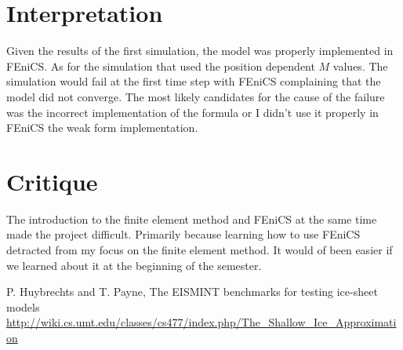 \documentclass{article}%
\begin{document}
    \section{Interpretation}

    Given the results of the first simulation, the model was properly implemented in FEniCS. As for the simulation that used the position dependent $M$ values. The simulation would fail at the first time step with FEniCS complaining that the model did not converge. The most likely candidates for the cause of the failure was the incorrect implementation of the formula or I didn't use it properly in FEniCS the weak form implementation.


    \section{Critique} 
    The introduction to the finite element method and FEniCS at the same time made the project difficult. Primarily because learning how to use FEniCS detracted from my focus on the finite element method. It would of been easier if we learned about it at the beginning of the semester.  

    \begin{thebibliography}{1}
         P. Huybrechts and T. Payne, The EISMINT benchmarks for testing ice-sheet models
         \url{http://wiki.cs.umt.edu/classes/cs477/index.php/The_Shallow_Ice_Approximation}
    \end{thebibliography} 
\end{document}
